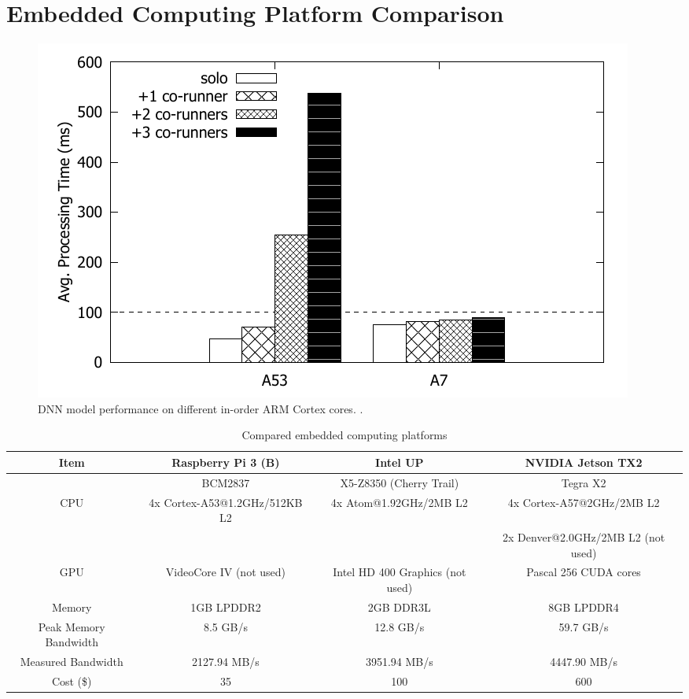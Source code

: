 
%

\section{Embedded Computing Platform Comparison}\label{sec:comparison}

\begin{figure}[h]
  \centering
  \includegraphics[width=.45\textwidth]{figs/a53_vs_a7}
  \caption{DNN model performance on different in-order
ARM Cortex cores. .}
  \label{fig:a53_vs_a7}
\end{figure}


\begin{table}[h]
  \centering
  \begin{adjustbox}{width=1\textwidth}
  \begin{tabular}{|c|c|c|c|}
    \hline
    Item    & Raspberry Pi 3 (B)   & Intel UP                  & NVIDIA Jetson TX2\\
    \hline
            & BCM2837              & X5-Z8350 (Cherry Trail)   & Tegra X2 \\
    CPU     & 4x Cortex-A53@1.2GHz/512KB L2  &
              4x Atom@1.92GHz/2MB L2 &
              4x Cortex-A57@2GHz/2MB L2 \\
            &              &              & 2x Denver@2.0GHz/2MB L2 (not used)  \\
    \hline
    GPU     &  VideoCore IV (not used)    &
               Intel HD 400 Graphics (not used) &
               Pascal 256 CUDA cores   \\
    \hline
    Memory  & 1GB LPDDR2   &  2GB DDR3L     & 8GB LPDDR4              \\
    \hline
	Peak Memory Bandwidth & 8.5 GB/s & 12.8 GB/s & 59.7 GB/s \\
	\hline
	Measured Bandwidth & 2127.94 MB/s & 3951.94 MB/s & 4447.90 MB/s \\
	\hline
	Cost (\$) & 35 & 100 & 600 \\
	\hline
  \end{tabular}
  \end{adjustbox}
  \caption{Compared embedded computing platforms}
  \label{tbl:platforms}
\end{table}

